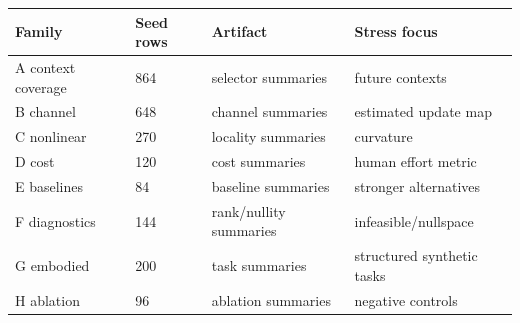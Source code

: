\begin{tabular}{llll}
\toprule
Family & Seed rows & Artifact & Stress focus \\
\midrule
A context coverage & 864 & selector summaries & future contexts \\
B channel & 648 & channel summaries & estimated update map \\
C nonlinear & 270 & locality summaries & curvature \\
D cost & 120 & cost summaries & human effort metric \\
E baselines & 84 & baseline summaries & stronger alternatives \\
F diagnostics & 144 & rank/nullity summaries & infeasible/nullspace \\
G embodied & 200 & task summaries & structured synthetic tasks \\
H ablation & 96 & ablation summaries & negative controls \\
\bottomrule
\end{tabular}
